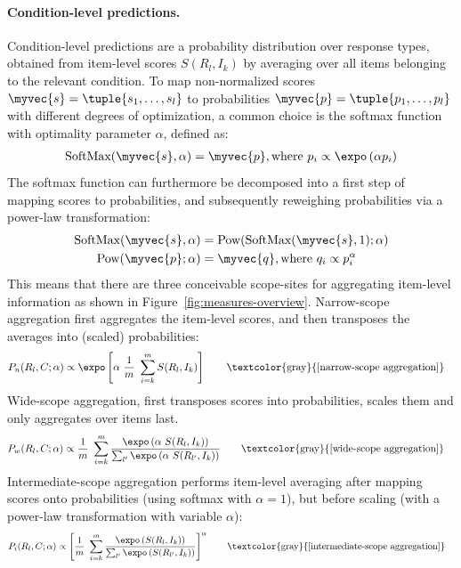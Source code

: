 \documentclass[fleqn]{article}
\begin{document}
\paragraph{Condition-level predictions.}
Condition-level predictions are a probability distribution over response types, obtained from item-level scores $S(R_{l}, I_{k})$ by averaging over all items belonging to the relevant condition.
To map non-normalized scores $\myvec{s} = \tuple{s_{1}, \dots, s_{l}}$ to probabilities $\myvec{p} = \tuple{p_{1}, \dots, p_{l}}$ with different degrees of optimization, a common choice is the softmax function with optimality parameter $\alpha$, defined as:
%
\begin{align*}
 \text{SoftMax}(\myvec{s}, \alpha) = \myvec{p}, \text{where } p_{i} \propto \expo \left (\alpha p_{i} \right )
\end{align*}
%
The softmax function can furthermore be decomposed into a first step of mapping scores to probabilities, and subsequently reweighing probabilities via a power-law transformation:
%
\begin{align*}
  \text{SoftMax}(\myvec{s}, \alpha) & = \text{Pow}( \text{SoftMax}(\myvec{s}, 1) ; \alpha) \\
  \text{Pow}(\myvec{p} ; \alpha) & = \myvec{q}, \text{where } q_{i} \propto p_{i}^{\alpha}
\end{align*}
%
This means that there are three conceivable scope-sites for aggregating item-level information as shown in Figure~\ref{fig:measures-overview}.
Narrow-scope aggregation first aggregates the item-level scores, and then transposes the averages into (scaled) probabilities:
%
\begin{align*}
  & P_{n}(R_{l}, C ; \alpha) \propto \expo \left [  \alpha \ \frac{1}{m} \ \sum_{i = k}^{m} S(R_{l}, I_{k})  \right ]
    \tag*{\textcolor{gray}{[narrow-scope aggregation]}}
\end{align*}
%
Wide-scope aggregation, first transposes scores into probabilities, scales them and only aggregates over items last.
\begin{align*}
  & P_{w}(R_{l}, C ; \alpha) \propto \frac{1}{m} \ \sum_{i = k}^{m} \frac{\expo \left( \alpha \ S(R_{l}, I_{k}) \right )}{ \sum_{l'} \expo \left( \alpha \ S(R_{l'}, I_{k}) \right )}
    \tag*{\textcolor{gray}{[wide-scope aggregation]}}
\end{align*}
%
Intermediate-scope aggregation performs item-level averaging after mapping scores onto probabilities (using softmax with $\alpha=1$), but before scaling (with a power-law transformation with variable $\alpha$):
\begin{align*}
  & P_{i}(R_{l}, C ; \alpha) \propto  \left [ \frac{1}{m} \ \sum_{i = k}^{m} \frac{\expo \left( S(R_{l}, I_{k}) \right )}{ \sum_{l'} \expo \left( S(R_{l'}, I_{k}) \right )} \right ]^{\alpha}
    \tag*{\textcolor{gray}{[intermediate-scope aggregation]}}
\end{align*}
\end{document}

